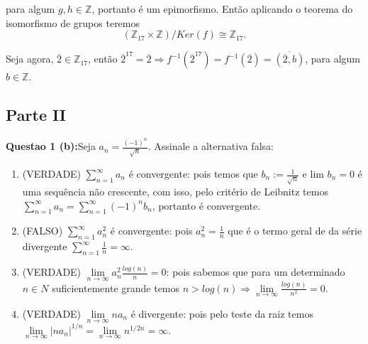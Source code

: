 \documentclass{article}
\begin{document}
\begin{enumerate}[label=(\alph*)]
	para algum $g, h \in \mathbb{Z}$, portanto é um epimorfismo. Então aplicando o teorema do isomorfismo de grupos teremos 
	$$
	(\mathbb{Z}_{17} \times \mathbb{Z})/Ker(f) \cong \mathbb{Z}_{17}.
	$$
	
	Seja agora, $\overline{2} \in \mathbb{Z}_{17}$, então $\overline{2}^{17} = \overline{2} \Rightarrow f^{-1}(\overline{2}^{17}) =f^{-1}(\overline{2}) = \overline{(\overline{2}, b)}$, para algum $b \in \mathbb{Z}$.
	
\end{enumerate}	
\subsection{Parte II}

\textbf{Questao 1 (b):}Seja $a_n = \frac{(-1)^{n}}{\sqrt{n}}$. Assinale a
alternativa falsa:

\begin{enumerate}[label=(\alph*)]
	\item (VERDADE) $\sum_{n=1}^{\infty} a_n$ é convergente: pois
temos que $b_n := \frac{1}{\sqrt{n}} $ e lim $b_n = 0$ é uma sequência não
crescente, com isso, pelo critério de Leibnitz temos $\sum_{n=1}^{\infty} a_n
= \sum_{n=1}^{\infty} (-1)^n b_n$, portanto é convergente.

	\item (FALSO) $\sum_{n=1}^{\infty} a_n^2$ é convergente: pois $a_n^2 =
\frac{1}{n}$ que é o termo geral de da série divergente $\sum_{n=1}^{\infty} \frac{1}{n} =
\infty$.

	\item (VERDADE) $\lim \limits_{n \to \infty} a_n^2 \frac{log(n)}{n} = 0$: pois sabemos
	que para um determinado $n \in N$ suficientemente grande temos $n > log(n)
\Rightarrow \lim \limits_{n \to \infty} \frac{log(n)}{n^2} = 0$.

	\item (VERDADE) $\lim \limits_{n \to \infty} na_n$ é divergente: pois pelo teste da
raiz temos $\lim \limits_{n \to \infty} |na_n|^{1/n} = \lim \limits_{n \to \infty}
n^{1/2n} = \infty$.

\end{enumerate}	
\end{document}
